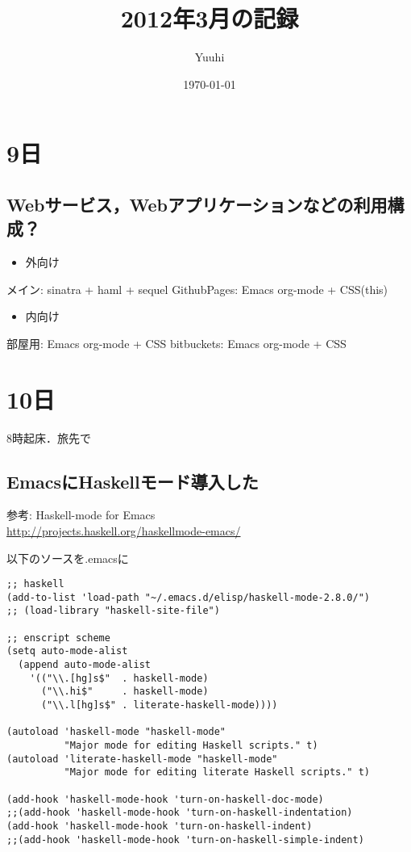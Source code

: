 \documentclass[11pt]{article}
\title{2012年3月の記録}
\author{Yuuhi}
\date{\today}
\begin{document}
\maketitle

\setcounter{tocdepth}{3}
\tableofcontents
\vspace*{1cm}

\section{9日}
\label{sec-1}
\subsection{Webサービス，Webアプリケーションなどの利用構成？}
\label{sec-1-1}

\begin{itemize}
\item 外向け
\end{itemize}
メイン: sinatra + haml + sequel
GithubPages: Emacs org-mode + CSS(this)
\begin{itemize}
\item 内向け
\end{itemize}
部屋用: Emacs org-mode + CSS
bitbuckets: Emacs org-mode + CSS
\section{10日}
\label{sec-2}

8時起床．旅先で
\subsection{EmacsにHaskellモード導入した}
\label{sec-2-1}


参考: 
Haskell-mode for Emacs\\
 \href{http://projects.haskell.org/haskellmode-emacs/}{http://projects.haskell.org/haskellmode-emacs/}

以下のソースを.emacsに

\begin{verbatim}
;; haskell
(add-to-list 'load-path "~/.emacs.d/elisp/haskell-mode-2.8.0/")
;; (load-library "haskell-site-file")

;; enscript scheme
(setq auto-mode-alist
  (append auto-mode-alist
    '(("\\.[hg]s$"  . haskell-mode)    
      ("\\.hi$"     . haskell-mode)
      ("\\.l[hg]s$" . literate-haskell-mode))))

(autoload 'haskell-mode "haskell-mode"
          "Major mode for editing Haskell scripts." t)
(autoload 'literate-haskell-mode "haskell-mode"
          "Major mode for editing literate Haskell scripts." t)

(add-hook 'haskell-mode-hook 'turn-on-haskell-doc-mode)
;;(add-hook 'haskell-mode-hook 'turn-on-haskell-indentation)
(add-hook 'haskell-mode-hook 'turn-on-haskell-indent)
;;(add-hook 'haskell-mode-hook 'turn-on-haskell-simple-indent)
\end{verbatim}
\end{document}
